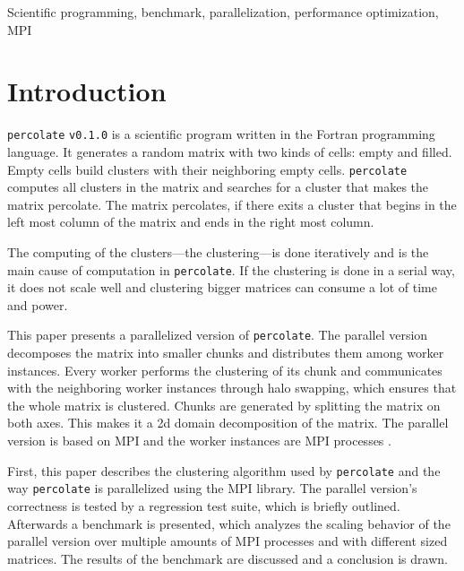 \documentclass[twoside,11pt]{article}
\title{\titl}
\author{}
\def\perc{\texttt{perco\-late}}
\def\v{\texttt{v0.1.0}}
\begin{document}
\maketitle

\begin{abstract}
\end{abstract}

\begin{keywords}
Scientific programming, benchmark, parallelization,
performance optimization, MPI
\end{keywords}

\section{Introduction} %

\perc{} \v{} is a scientific program written in the Fortran
programming language. It generates a random matrix with two
kinds of cells: empty and filled. Empty cells build
clusters with their neighboring empty cells.
\perc{} computes all clusters in the matrix and searches
for a cluster that makes the matrix percolate.
The matrix percolates, if there exits a cluster that begins
in the left most column of the matrix and ends in the right
most column.

The computing of the clusters---the clustering---is done
iteratively and is the main cause of computation in
\perc{}.
If the clustering is done in a serial way, it does not
scale well and clustering bigger matrices can consume a
lot of time and power.

This paper presents a parallelized version of \perc{}.
The parallel version decomposes the matrix into smaller
chunks and distributes them among worker instances.
Every worker performs the clustering of its chunk and
communicates with the neighboring worker
instances through halo swapping, which ensures that the
whole matrix is clustered.
Chunks are generated by splitting the matrix on both axes.
This makes it a 2d domain decomposition of the matrix.
The parallel version is based on MPI and the worker
instances are MPI processes \citep[see][]{mpi}.

First, this paper describes the clustering algorithm used
by \perc{} and the way \perc{} is parallelized using the
MPI library.
The parallel version's correctness is tested by a
regression test suite, which is briefly outlined.
Afterwards a benchmark is presented, which analyzes the
scaling behavior of the parallel version over multiple
amounts of MPI processes and with different sized matrices.
The results of the benchmark are discussed and a conclusion
is drawn.
\end{document}
